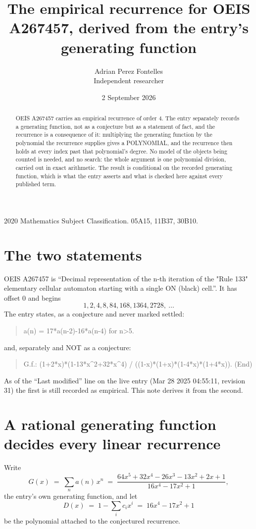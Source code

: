 \documentclass[11pt,a4paper]{article}
\title{The empirical recurrence for OEIS A267457, derived from the entry's generating function}
\author{Adrian Perez Fontelles\\ \small Independent researcher}
\date{2 September 2026}
\theoremstyle{plain}
\theoremstyle{definition}
\begin{document}
\maketitle

\begin{abstract}
OEIS A267457 carries an empirical recurrence of order $4$. The entry separately records a
generating function, not as a conjecture but as a statement of fact, and the recurrence is a
consequence of it: multiplying the generating function by the polynomial the recurrence
supplies gives a POLYNOMIAL, and the recurrence then holds at every index past that
polynomial's degree. No model of the objects being counted is needed, and no search: the
whole argument is one polynomial division, carried out in exact arithmetic. The result is
conditional on the recorded generating function, which is what the entry asserts and what is
checked here against every published term.
\end{abstract}

\noindent\small 2020 Mathematics Subject Classification. 05A15, 11B37, 30B10.\normalsize

\section{The two statements}

OEIS A267457 is ``Decimal representation of the n-th iteration of the "Rule 133" elementary cellular automaton starting with a single ON (black) cell.''. It has offset $0$ and begins
\[
1, 2, 4, 8, 84, 168, 1364, 2728,\ \dots
\]
The entry states, as a conjecture and never marked settled:
\begin{quote}
a(n) = 17*a(n-2)-16*a(n-4) for n>5.
\end{quote}
and, separately and NOT as a conjecture:
\begin{quote}
G.f.: (1+2*x)*(1-13*x\^{}2+32*x\^{}4) / ((1-x)*(1+x)*(1-4*x)*(1+4*x)). (End)
\end{quote}
As of the ``Last modified'' line on the live entry (Mar 28 2025 04:55:11, revision 31) the first is still
recorded as empirical. This note derives it from the second.

\section{A rational generating function decides every linear recurrence}

Write
\[
G(x)\;=\;\sum_{n}a(n)\,x^{n}\;=\;\frac{64 x^{5} + 32 x^{4} - 26 x^{3} - 13 x^{2} + 2 x + 1}{16 x^{4} - 17 x^{2} + 1},
\]
the entry's own generating function, and let
\[
D(x)\;=\;1-\sum_i c_i x^{i}\;=\;16 x^{4} - 17 x^{2} + 1
\]
be the polynomial attached to the conjectured recurrence.
\end{document}
